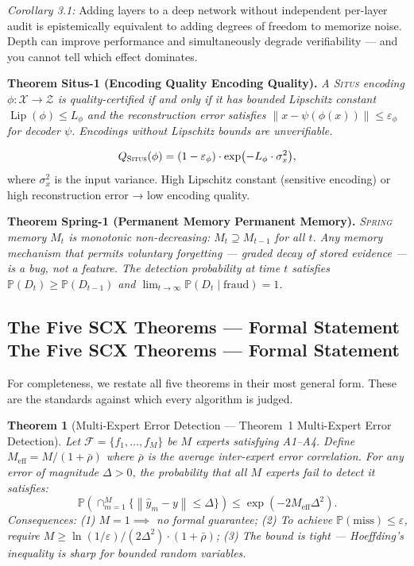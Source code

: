 \documentclass[12pt,a4paper]{article}
\newtheorem{theorem}{Theorem}[section]
\theoremstyle{definition}
\newcommand{\Situs}{\textsc{Situs}}
\newcommand{\Spring}{\textsc{Spring}}
\DeclareMathOperator{\Lip}{Lip}
\newcommand{\Pbb}{\mathbb{P}}
\newcommand{\cF}{\mathcal{F}}
\newcommand{\cX}{\mathcal{X}}
\newcommand{\cZ}{\mathcal{Z}}
\newcommand{\norm}[1]{\left\lVert#1\right\rVert}
\begin{document}
\textit{Corollary 3.1:} Adding layers to a deep network without independent per-layer audit is epistemically equivalent to adding degrees of freedom to memorize noise. Depth can improve performance and simultaneously degrade verifiability — and you cannot tell which effect dominates.

\medskip
\noindent\textbf{Theorem Situs-1 (Encoding Quality Encoding Quality).} \textit{A \Situs{} encoding $\phi: \cX \to \cZ$ is quality-certified if and only if it has bounded Lipschitz constant $\Lip(\phi) \le L_\phi$ and the reconstruction error satisfies $\norm{x - \psi(\phi(x))} \le \varepsilon_\phi$ for decoder $\psi$. Encodings without Lipschitz bounds are unverifiable.}

\begin{equation}\label{eq:situs}
    Q_{\Situs}(\phi) = (1 - \varepsilon_\phi) \cdot \exp\bigl(-L_\phi \cdot \sigma_x^2\bigr),
\end{equation}
where $\sigma_x^2$ is the input variance. High Lipschitz constant (sensitive encoding) or high reconstruction error → low encoding quality.

\medskip
\noindent\textbf{Theorem Spring-1 (Permanent Memory Permanent Memory).} \textit{\Spring{} memory $M_t$ is monotonic non-decreasing: $M_t \supseteq M_{t-1}$ for all $t$. Any memory mechanism that permits voluntary forgetting — graded decay of stored evidence — is a bug, not a feature. The detection probability at time $t$ satisfies $\Pbb(D_t) \ge \Pbb(D_{t-1})$ and $\lim_{t\to\infty}\Pbb(D_t \mid \text{fraud}) = 1$.}

\subsection{The Five SCX Theorems — Formal Statement The Five SCX Theorems --- Formal Statement}

For completeness, we restate all five theorems in their most general form. These are the standards against which every algorithm is judged.

\begin{theorem}[Multi-Expert Error Detection — Theorem~1 Multi-Expert Error Detection]
\label{thm:1_formal}
Let $\cF = \{f_1, \ldots, f_M\}$ be $M$ experts satisfying A1--A4. Define $M_{\text{eff}} = M/(1+\bar{\rho})$ where $\bar{\rho}$ is the average inter-expert error correlation. For any error of magnitude $\Delta > 0$, the probability that all $M$ experts fail to detect it satisfies:
\[
\Pbb(\cap_{m=1}^M \{\norm{\hat{y}_m - y} \le \Delta\}) \le \exp(-2M_{\text{eff}}\Delta^2).
\]
\textit{Consequences:} (1) $M=1 \implies$ no formal guarantee; (2) To achieve $\Pbb(\text{miss}) \le \varepsilon$, require $M \ge \ln(1/\varepsilon)/(2\Delta^2) \cdot (1+\bar{\rho})$; (3) The bound is tight — Hoeffding's inequality is sharp for bounded random variables.
\end{theorem}
\end{document}
